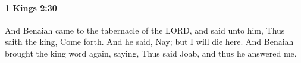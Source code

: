 
		\paragraph{1 Kings 2:30} %
			\label{1KINGS-2-30}

			And Benaiah came to the tabernacle of the LORD, and said unto him, Thus saith the king, Come forth. And he said, Nay; but I will die here. And Benaiah brought the king word again, saying, Thus said Joab, and thus he answered me.


